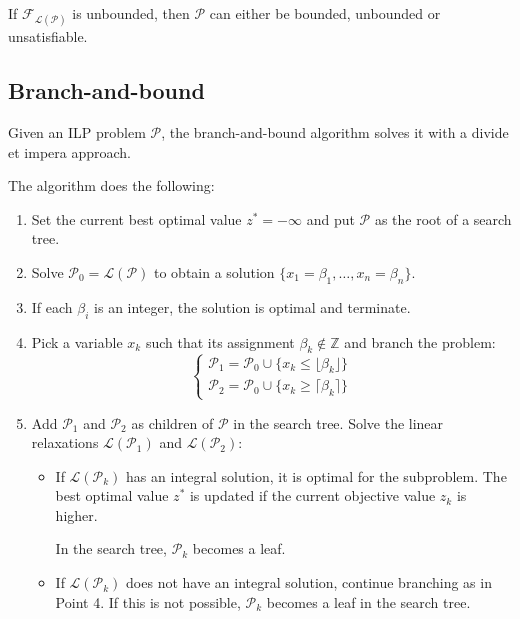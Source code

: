 \begin{remark}
    If $\mathcal{F}_{\mathcal{L}(\mathcal{P})}$ is unbounded, then $\mathcal{P}$ can either be bounded, unbounded or unsatisfiable.
\end{remark}



\subsection{Branch-and-bound}

Given an ILP problem $\mathcal{P}$, the branch-and-bound algorithm solves it with a divide et impera approach.

The algorithm does the following:
\begin{enumerate}
    \item Set the current best optimal value $z^* = -\infty$ and put $\mathcal{P}$ as the root of a search tree.
    \item Solve $\mathcal{P}_0 = \mathcal{L}(\mathcal{P})$ to obtain a solution $\{ x_1 = \beta_1, \dots, x_n = \beta_n \}$.
    \item If each $\beta_i$ is an integer, the solution is optimal and terminate.
    \item Pick a variable $x_k$ such that its assignment $\beta_k \notin \mathbb{Z}$ and branch the problem:
        \[
            \begin{cases}
                \mathcal{P}_1 = \mathcal{P}_0 \cup \{ x_k \leq \lfloor \beta_k \rfloor \} \\
                \mathcal{P}_2 = \mathcal{P}_0 \cup \{ x_k \geq \lceil \beta_k \rceil \}
            \end{cases}
        \]
    \item Add $\mathcal{P}_1$ and $\mathcal{P}_2$ as children of $\mathcal{P}$ in the search tree.
        Solve the linear relaxations $\mathcal{L}(\mathcal{P}_1)$ and $ \mathcal{L}(\mathcal{P}_2)$:
        \begin{itemize}
            \item If $\mathcal{L}(\mathcal{P}_k)$ has an integral solution, it is optimal for the subproblem.
                The best optimal value $z^*$ is updated if the current objective value $z_k$ is higher.

                In the search tree, $\mathcal{P}_k$ becomes a leaf.
            
            \item If $\mathcal{L}(\mathcal{P}_k)$ does not have an integral solution, continue branching as in Point 4.
                If this is not possible, $\mathcal{P}_k$ becomes a leaf in the search tree.
        \end{itemize}
\end{enumerate}

